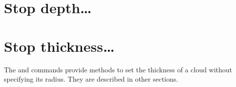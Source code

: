 \section{Stop depth\dots}

\section{Stop thickness\dots}

The  and  commands
provide methods to set the thickness of a cloud without
specifying its radius.
They are described in other sections.






